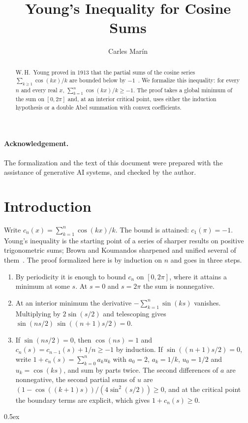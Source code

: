 \documentclass[10pt,a4paper]{article}
\begin{document}
\title{Young's Inequality for Cosine Sums}
\author{Carles Mar\'in}
\maketitle

\begin{abstract}
W.\,H.~Young proved in 1913 that the partial sums of the cosine series $\sum_{k \geq 1} \cos(kx)/k$ are bounded
below by $-1$~\cite{Young1913}. We formalize this inequality: for every $n$ and every real $x$,
$\sum_{k=1}^{n} \cos(kx)/k \geq -1$. The proof takes a global minimum of the sum on $[0, 2\pi]$ and, at an
interior critical point, uses either the induction hypothesis or a double Abel summation with convex
coefficients.
\end{abstract}

\paragraph{Acknowledgement.} The formalization and the text of this document were prepared with the
assistance of generative AI systems, and checked by the author.

\tableofcontents

\section*{Introduction}

Write $c_n(x) = \sum_{k=1}^{n} \cos(kx)/k$. The bound is attained: $c_1(\pi) = -1$. Young's inequality is
the starting point of a series of sharper results on positive trigonometric sums; Brown and Koumandos sharpened
and unified several of them~\cite{BrownKoumandos1997}. The proof formalized here is by induction on $n$ and goes
in three steps.
\begin{enumerate}
\item By periodicity it is enough to bound $c_n$ on $[0, 2\pi]$, where it attains a minimum at some $s$. At
  $s = 0$ and $s = 2\pi$ the sum is nonnegative.
\item At an interior minimum the derivative $-\sum_{k=1}^{n} \sin(ks)$ vanishes. Multiplying by $2\sin(s/2)$
  and telescoping gives $\sin(ns/2)\,\sin((n+1)s/2) = 0$.
\item If $\sin(ns/2) = 0$, then $\cos(ns) = 1$ and $c_n(s) = c_{n-1}(s) + 1/n \geq -1$ by induction. If
  $\sin((n+1)s/2) = 0$, write $1 + c_n(s) = \sum_{k=0}^{n} a_k u_k$ with $a_0 = 2$, $a_k = 1/k$, $u_0 = 1/2$ and
  $u_k = \cos(ks)$, and sum by parts twice. The second differences of $a$ are nonnegative, the second partial
  sums of $u$ are $(1 - \cos((k+1)s)) / (4 \sin^2(s/2)) \geq 0$, and at the critical point the boundary terms
  are explicit, which gives $1 + c_n(s) \geq 0$.
\end{enumerate}

\parindent 0pt\parskip 0.5ex





\end{document}
